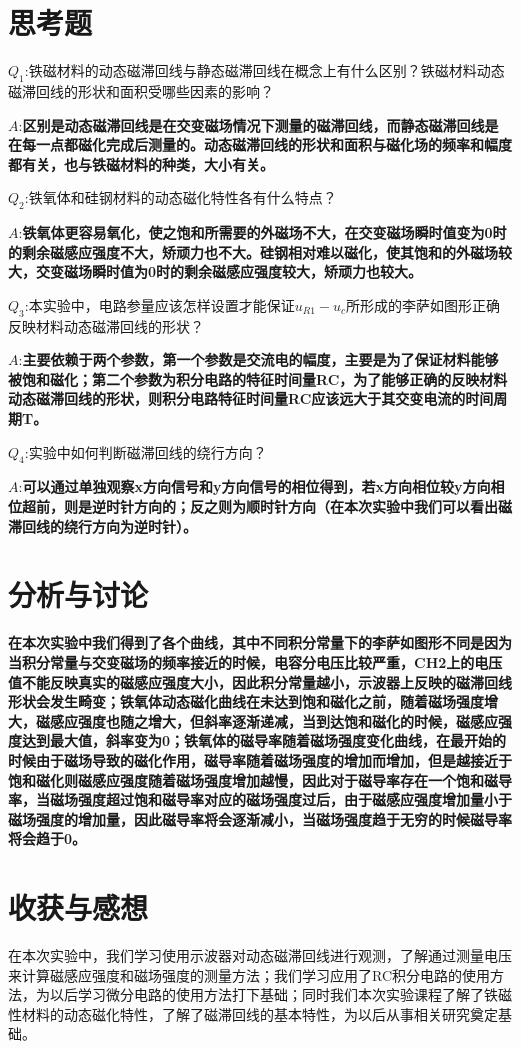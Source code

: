 \documentclass[UTF8]{ctexart}
\begin{document}
	\section{思考题}
	{\large{\textbf{$Q_{1}$}}}:\normalsize 铁磁材料的动态磁滞回线与静态磁滞回线在概念上有什么区别？铁磁材料动态磁滞回线的形状和面积受哪些因素的影响？
	\par{\large{\textbf{$A$}}}:\normalsize \textbf{区别是动态磁滞回线是在交变磁场情况下测量的磁滞回线，而静态磁滞回线是在每一点都磁化完成后测量的。动态磁滞回线的形状和面积与磁化场的频率和幅度都有关，也与铁磁材料的种类，大小有关。}
	\par {\large{\textbf{$Q_{2}$}}}:\normalsize 铁氧体和硅钢材料的动态磁化特性各有什么特点？
	\par{\large{\textbf{$A$}}}:\normalsize \textbf{铁氧体更容易氧化，使之饱和所需要的外磁场不大，在交变磁场瞬时值变为0时的剩余磁感应强度不大，矫顽力也不大。硅钢相对难以磁化，使其饱和的外磁场较大，交变磁场瞬时值为0时的剩余磁感应强度较大，矫顽力也较大。}
	\par {\large{\textbf{$Q_{3}$}}}:\normalsize 本实验中，电路参量应该怎样设置才能保证$u_{R1}-u_{c}$所形成的李萨如图形正确反映材料动态磁滞回线的形状？
    \par{\large{\textbf{$A$}}}:\normalsize \textbf{主要依赖于两个参数，第一个参数是交流电的幅度，主要是为了保证材料能够被饱和磁化；第二个参数为积分电路的特征时间量RC，为了能够正确的反映材料动态磁滞回线的形状，则积分电路特征时间量RC应该远大于其交变电流的时间周期T。}
    \par {\large{\textbf{$Q_{4}$}}}:\normalsize 实验中如何判断磁滞回线的绕行方向？
    \par{\large{\textbf{$A$}}}:\normalsize \textbf{可以通过单独观察x方向信号和y方向信号的相位得到，若x方向相位较y方向相位超前，则是逆时针方向的；反之则为顺时针方向（在本次实验中我们可以看出磁滞回线的绕行方向为逆时针）。}
	\section{分析与讨论}
	\textbf{在本次实验中我们得到了各个曲线，其中不同积分常量下的李萨如图形不同是因为当积分常量与交变磁场的频率接近的时候，电容分电压比较严重，CH2上的电压值不能反映真实的磁感应强度大小，因此积分常量越小，示波器上反映的磁滞回线形状会发生畸变；铁氧体动态磁化曲线在未达到饱和磁化之前，随着磁场强度增大，磁感应强度也随之增大，但斜率逐渐递减，当到达饱和磁化的时候，磁感应强度达到最大值，斜率变为0；铁氧体的磁导率随着磁场强度变化曲线，在最开始的时候由于磁场导致的磁化作用，磁导率随着磁场强度的增加而增加，但是越接近于饱和磁化则磁感应强度随着磁场强度增加越慢，因此对于磁导率存在一个饱和磁导率，当磁场强度超过饱和磁导率对应的磁场强度过后，由于磁感应强度增加量小于磁场强度的增加量，因此磁导率将会逐渐减小，当磁场强度趋于无穷的时候磁导率将会趋于0。}
	\section{收获与感想}
	在本次实验中，我们学习使用示波器对动态磁滞回线进行观测，了解通过测量电压来计算磁感应强度和磁场强度的测量方法；我们学习应用了RC积分电路的使用方法，为以后学习微分电路的使用方法打下基础；同时我们本次实验课程了解了铁磁性材料的动态磁化特性，了解了磁滞回线的基本特性，为以后从事相关研究奠定基础。
\end{document}
